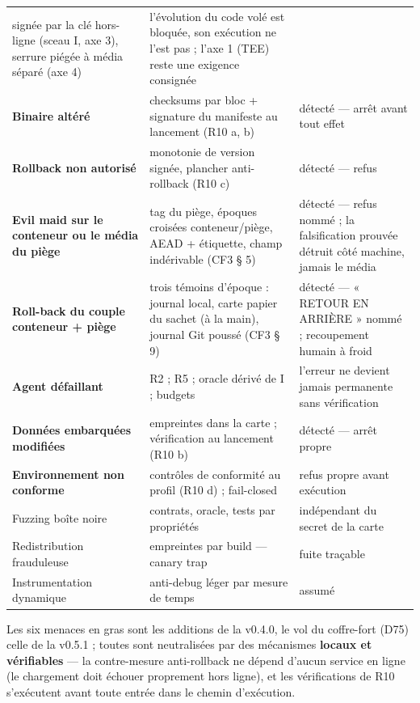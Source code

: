 \begin{table}[htbp]
\begin{tabularx}{\textwidth}{@{}Y Y Y@{}}
signée par la clé hors-ligne (sceau I, axe 3), serrure piégée à média séparé (axe 4) &
l'évolution du code volé est bloquée, son exécution ne l'est pas ; l'axe 1 (TEE) reste une
exigence consignée \\
\textbf{Binaire altéré} & checksums par bloc + signature du manifeste au lancement
(R10 a, b) & détecté — arrêt avant tout effet \\
\textbf{Rollback non autorisé} & monotonie de version signée, plancher anti-rollback
(R10 c) & détecté — refus \\
\textbf{Evil maid sur le conteneur ou le média du piège} & tag du piège, époques
croisées conteneur/piège, AEAD + étiquette, champ  indérivable (CF3
§ 5) & détecté — refus nommé ; la falsification prouvée détruit côté machine,
jamais le média \\
\textbf{Roll-back du couple conteneur + piège} & trois témoins d'époque : journal
local, carte papier du sachet (à la main), journal Git poussé (CF3 § 9) & détecté —
« RETOUR EN ARRIÈRE » nommé ; recoupement humain à froid \\
\textbf{Agent défaillant} & R2 ; R5 ; oracle dérivé de I ; budgets & l'erreur ne devient
jamais permanente sans vérification \\
\textbf{Données embarquées modifiées} & empreintes dans la carte ; vérification au
lancement (R10 b) & détecté — arrêt propre \\
\textbf{Environnement non conforme} & contrôles de conformité au profil (R10 d) ;
fail-closed & refus propre avant exécution \\
Fuzzing boîte noire & contrats, oracle, tests par propriétés & indépendant du secret de
la carte \\
Redistribution frauduleuse & empreintes par build — canary trap & fuite traçable \\
Instrumentation dynamique & anti-debug léger par mesure de temps & assumé \\
\bottomrule
\end{tabularx}
\end{table}

Les six menaces en gras sont les additions de la v0.4.0, le vol du coffre-fort (D75)
celle de la v0.5.1 ; toutes sont neutralisées par des mécanismes \textbf{locaux et
vérifiables} — la contre-mesure anti-rollback ne dépend d'aucun service en ligne (le
chargement doit échouer proprement hors ligne), et les vérifications de R10 s'exécutent
avant toute entrée dans le chemin d'exécution.

